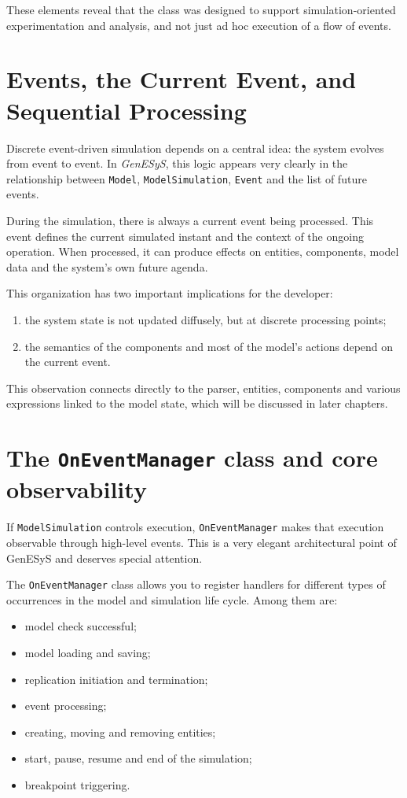 These elements reveal that the class was designed to support simulation-oriented experimentation and analysis, and not just ad hoc execution of a flow of events.

\section{Events, the Current Event, and Sequential Processing}
\label{sec:cap7_eventos_evento_corrente_processamento}

Discrete event-driven simulation depends on a central idea: the system evolves from event to event. In \textit{GenESyS}, this logic appears very clearly in the relationship between \texttt{Model}, \texttt{ModelSimulation}, \texttt{Event} and the list of future events.

During the simulation, there is always a current event being processed. This event defines the current simulated instant and the context of the ongoing operation. When processed, it can produce effects on entities, components, model data and the system's own future agenda.

This organization has two important implications for the developer:
\begin{enumerate}
 \item the system state is not updated diffusely, but at discrete processing points;
 \item the semantics of the components and most of the model's actions depend on the current event.
\end{enumerate}

This observation connects directly to the parser, entities, components and various expressions linked to the model state, which will be discussed in later chapters.

\section{The \texttt{OnEventManager} class and core observability}
\label{sec:cap7_classe_oneventmanager}

If \texttt{ModelSimulation} controls execution, \texttt{OnEventManager} makes that execution observable through high-level events. This is a very elegant architectural point of GenESyS and deserves special attention.

The \texttt{OnEventManager} class allows you to register handlers for different types of occurrences in the model and simulation life cycle. Among them are:
\begin{itemize}
 \item model check successful;
 \item model loading and saving;
 \item replication initiation and termination;
 \item event processing;
 \item creating, moving and removing entities;
 \item start, pause, resume and end of the simulation;
 \item breakpoint triggering.
\end{itemize}

